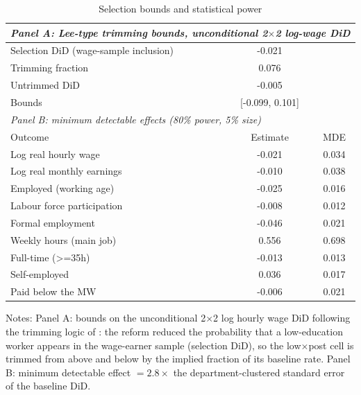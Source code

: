 \begin{table}[H]\centering
\caption{Selection bounds and statistical power}\label{tab:leemde}
\begin{threeparttable}
\footnotesize
\begin{tabular}{lcc}
\toprule
\multicolumn{3}{l}{\emph{Panel A: Lee-type trimming bounds, unconditional 2$\times$2 log-wage DiD}}\\
\midrule
Selection DiD (wage-sample inclusion) & -0.021 & \\
Trimming fraction & 0.076 & \\
Untrimmed DiD & -0.005 & \\
Bounds & [-0.099, 0.101] & \\
\midrule
\multicolumn{3}{l}{\emph{Panel B: minimum detectable effects (80\% power, 5\% size)}}\\
Outcome & Estimate & MDE \\ \midrule
Log real hourly wage & -0.021 & 0.034 \\
Log real monthly earnings & -0.010 & 0.038 \\
Employed (working age) & -0.025 & 0.016 \\
Labour force participation & -0.008 & 0.012 \\
Formal employment & -0.046 & 0.021 \\
Weekly hours (main job) & 0.556 & 0.698 \\
Full-time (>=35h) & -0.013 & 0.013 \\
Self-employed & 0.036 & 0.017 \\
Paid below the MW & -0.006 & 0.021 \\
\bottomrule
\end{tabular}
\begin{tablenotes}\footnotesize
\item Notes: Panel A: bounds on the unconditional 2$\times$2 log hourly wage DiD following the trimming logic of \citet{lee_2009}: the reform reduced the probability that a low-education worker appears in the wage-earner sample (selection DiD), so the low$\times$post cell is trimmed from above and below by the implied fraction of its baseline rate. Panel B: minimum detectable effect $=2.8\times$ the department-clustered standard error of the baseline DiD.
\end{tablenotes}
\end{threeparttable}\end{table}
